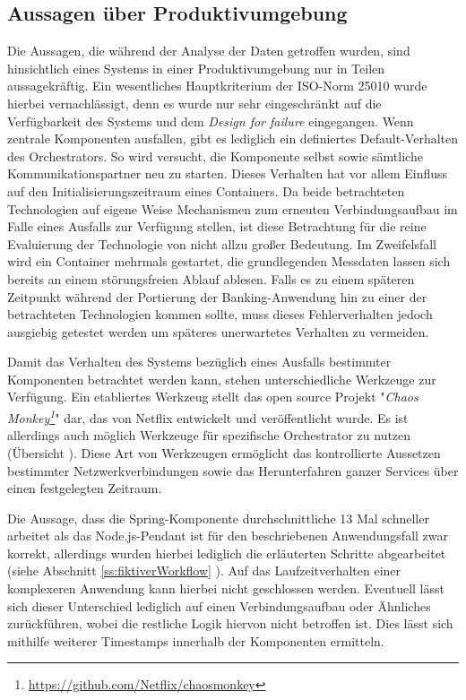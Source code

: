 \subsection{Aussagen über Produktivumgebung}
Die Aussagen, die während der Analyse der Daten getroffen wurden, sind hinsichtlich eines Systems in einer Produktivumgebung nur in Teilen aussagekräftig. Ein wesentliches Hauptkriterium der ISO-Norm 25010  wurde hierbei vernachlässigt, denn es wurde nur sehr eingeschränkt auf die Verfügbarkeit des Systems und dem \emph{Design for failure} eingegangen. Wenn zentrale Komponenten ausfallen, gibt es lediglich ein definiertes Default-Verhalten des Orchestrators. So wird versucht, die Komponente selbst sowie sämtliche Kommunikationspartner neu zu starten. Dieses Verhalten hat vor allem Einfluss auf den Initialisierungszeitraum eines Containers. Da beide betrachteten Technologien auf eigene Weise Mechanismen zum erneuten Verbindungsaufbau im Falle eines Ausfalls zur Verfügung stellen, ist diese Betrachtung für die reine Evaluierung der Technologie von nicht allzu großer Bedeutung. Im Zweifelsfall wird ein Container mehrmals gestartet, die grundlegenden Messdaten lassen sich bereits an einem störungsfreien Ablauf ablesen. Falls es zu einem späteren Zeitpunkt während der Portierung der Banking-Anwendung hin zu einer der betrachteten Technologien kommen sollte, muss dieses Fehlerverhalten jedoch ausgiebig getestet werden um späteres unerwartetes Verhalten zu vermeiden. 

Damit das Verhalten des Systems bezüglich eines Ausfalls bestimmter Komponenten betrachtet werden kann, stehen unterschiedliche Werkzeuge zur Verfügung. Ein etabliertes Werkzeug stellt das open source Projekt "\emph{Chaos Monkey\footnote{\url{https://github.com/Netflix/chaosmonkey}}}" dar, das von Netflix entwickelt und veröffentlicht wurde. Es ist allerdings auch möglich Werkzeuge für spezifische Orchestrator zu nutzen (Übersicht \cite[Seite~369]{continuous-delivery}). Diese Art von Werkzeugen ermöglicht das kontrollierte Aussetzen bestimmter Netzwerkverbindungen sowie das Herunterfahren ganzer Services über einen festgelegten Zeitraum. 

Die Aussage, dass die Spring-Komponente durchschnittliche 13 Mal schneller arbeitet als das Node.js-Pendant ist für den beschriebenen Anwendungsfall zwar korrekt, allerdings wurden hierbei lediglich die erläuterten Schritte abgearbeitet (siehe Abschnitt \ref{ss:fiktiverWorkflow} ). Auf das Laufzeitverhalten einer komplexeren Anwendung kann hierbei nicht geschlossen werden. Eventuell lässt sich dieser Unterschied lediglich auf einen Verbindungsaufbau oder Ähnliches zurückführen, wobei die restliche Logik hiervon nicht betroffen ist. Dies lässt sich mithilfe weiterer Timestamps innerhalb der Komponenten ermitteln.


